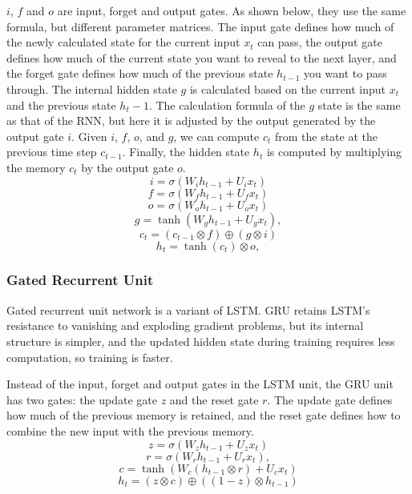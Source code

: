 \documentclass{article}
\begin{document}
$i$, $f$ and $o$ are input, forget and output gates. As shown below, they use the same formula, but different parameter matrices. The input gate defines how much of the newly calculated state for the current input $x_{t}$ can pass, the output gate defines how much of the current state you want to reveal to the next layer, and the forget gate defines how much of the previous state $h_{t-1}$ you want to pass through. The internal hidden state $g$ is calculated based on the current input $x_t$ and the previous state $h_t-1$. The calculation formula of the $g$ state is the same as that of the RNN, but here it is adjusted by the output generated by the output gate $i$. Given $i$, $f$, $o$, and $g$, we can compute $c_{t}$ from the state at the previous time step $c_{t-1}$. Finally, the hidden state $h_{t}$ is computed by multiplying the memory $c_{t}$ by the output gate $o$.
\begin{equation}
i=\sigma\left(W_{i} h_{t-1}+U_{i} x_{t}\right)
\end{equation}
\begin{equation}
f=\sigma\left(W_{f} h_{t-1}+U_{f} x_{t}\right)
\end{equation}
\begin{equation}
o=\sigma\left(W_{o} h_{t-1}+U_{o} x_{t}\right)
\end{equation}
\begin{equation}
g=\tanh \left(W_{g} h_{t-1}+U_{g} x_{t}\right),
\end{equation}
\begin{equation}
c_{t}=\left(c_{t-1} \otimes f\right) \oplus(g \otimes i)
\end{equation}
\begin{equation}
h_{t}=\tanh \left(c_{t}\right) \otimes o,
\end{equation}


\subsubsection{Gated Recurrent Unit}
Gated recurrent unit network is a variant of LSTM. GRU retains LSTM's resistance to vanishing and exploding gradient problems, but its internal structure is simpler, and the updated hidden state during training requires less computation, so training is faster.

Instead of the input, forget and output gates in the LSTM unit, the GRU unit has two gates: the update gate $z$ and the reset gate $r$. The update gate defines how much of the previous memory is retained, and the reset gate defines how to combine the new input with the previous memory.
\begin{equation}
z=\sigma\left(W_{z} h_{t-1}+U_{z} x_{t}\right)
\end{equation}
\begin{equation}
r=\sigma\left(W_{r} h_{t-1}+U_{r} x_{t}\right),
\end{equation}
\begin{equation}
c=\tanh \left(W_{c}\left(h_{t-1} \otimes r\right)+U_{c} x_{t}\right)
\end{equation}
\begin{equation}
h_{t}=(z \otimes c) \oplus\left((1-z) \otimes h_{t-1}\right)
\end{equation}
\end{document}

